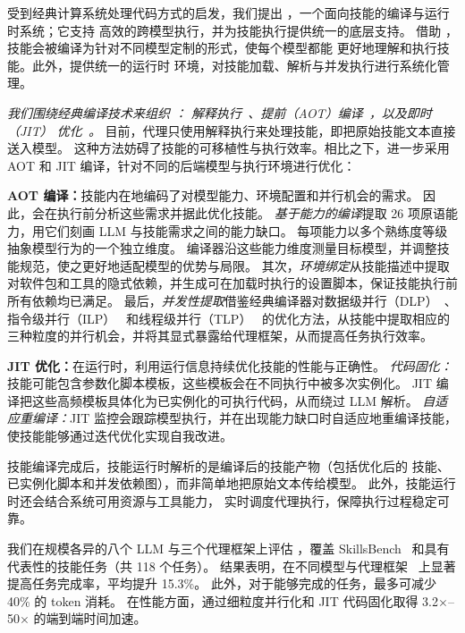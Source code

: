 受到经典计算系统处理代码方式的启发，我们提出
\sys，一个面向技能的编译与运行时系统；它支持
高效的跨模型执行，并为技能执行提供统一的底层支持。
借助 \sys，技能会被编译为针对不同模型定制的形式，使每个模型都能
更好地理解和执行技能。此外，\sys 提供统一的运行时
环境，对技能加载、解析与并发执行进行系统化管理。

\textit{我们围绕经典编译技术来组织 \sys：
解释执行~\cite{jansen2007interpretation}、提前（AOT）编译~\cite{serrano2021javascript, serrano2018javascript}，以及即时（JIT）
优化~\cite{aho2006compilers, aycock2003jit, suganuma2000overview, ishizaki2000study, cramer1997compiling}。}
目前，代理只使用解释执行来处理技能，即把原始技能文本直接送入模型。
这种方法妨碍了技能的可移植性与执行效率。相比之下，\sys 进一步采用
AOT 和 JIT 编译，针对不同的后端模型与执行环境进行优化：

\textbf{AOT 编译：}技能内在地编码了对模型能力、环境配置和并行机会的需求。
因此，\sys 会在执行前分析这些需求并据此优化技能。
\emph{基于能力的编译}提取 26 项原语能力，用它们刻画 LLM 与技能需求之间的能力缺口。
每项能力以多个熟练度等级抽象模型行为的一个独立维度。
编译器沿这些能力维度测量目标模型，并调整技能规范，使之更好地适配模型的优势与局限。
其次，\emph{环境绑定}从技能描述中提取对软件包和工具的隐式依赖，并生成可在加载时执行的设置脚本，保证技能执行前所有依赖均已满足。
最后，\emph{并发性提取}借鉴经典编译器对数据级并行（DLP）~\cite{kalathingal2016dynamic}、指令级并行（ILP）~\cite{ranganathan1998empirical, kastner2001ilp} 和线程级并行（TLP）~\cite{redstone2003mini} 的优化方法，从技能中提取相应的三种粒度的并行机会，并将其显式暴露给代理框架，从而提高任务执行效率。

\textbf{JIT 优化：}在运行时，\sys 利用运行信息持续优化技能的性能与正确性。
\emph{代码固化：}技能可能包含参数化脚本模板，这些模板会在不同执行中被多次实例化。
JIT 编译把这些高频模板具体化为已实例化的可执行代码，从而绕过 LLM 解析。
\emph{自适应重编译：}JIT 监控会跟踪模型执行，并在出现能力缺口时自适应地重编译技能，
使技能能够通过迭代优化实现自我改进。

技能编译完成后，技能运行时解析的是编译后的技能产物（包括优化后的
技能、已实例化脚本和并发依赖图），而非简单地把原始文本传给模型。
此外，技能运行时还会结合系统可用资源与工具能力，
实时调度代理执行，保障执行过程稳定可靠。

我们在规模各异的八个 LLM 与三个代理框架上评估 \sys，覆盖 SkillsBench~\cite{li2026skillsbench} 和具有代表性的技能任务（共 118 个任务）。
结果表明，\sys 在不同模型与代理框架~\cite{claudecode,opencode} 上显著提高任务完成率，平均提升 15.3\%。
此外，对于能够完成的任务，\sys 最多可减少 40\% 的 token 消耗。
在性能方面，\sys 通过细粒度并行化和 JIT 代码固化取得 3.2$\times$--50$\times$ 的端到端时间加速。
